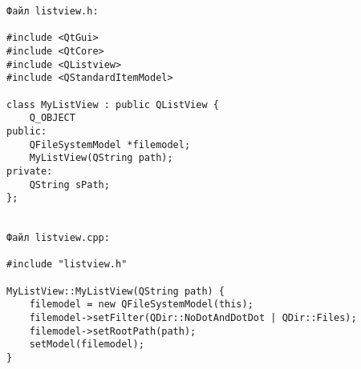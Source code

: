 \begin{verbatim}
Файл listview.h:

#include <QtGui>
#include <QtCore>
#include <QListview>
#include <QStandardItemModel>

class MyListView : public QListView {
    Q_OBJECT
public:
    QFileSystemModel *filemodel;
    MyListView(QString path);
private:
    QString sPath;
};


Файл listview.cpp:

#include "listview.h"

MyListView::MyListView(QString path) {
    filemodel = new QFileSystemModel(this);
    filemodel->setFilter(QDir::NoDotAndDotDot | QDir::Files);
    filemodel->setRootPath(path);
    setModel(filemodel);
}
\end{verbatim}
